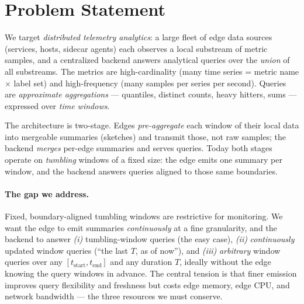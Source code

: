 
\section{Problem Statement}
\label{sec:problem}

We target \emph{distributed telemetry analytics}: a large fleet of edge
data sources (services, hosts, sidecar agents) each observes a local
substream of metric samples, and a centralized backend answers
analytical queries over the \emph{union} of all substreams. The metrics
are high-cardinality (many time series = metric name $\times$ label set)
and high-frequency (many samples per series per second). Queries are
\emph{approximate aggregations} --- quantiles, distinct counts, heavy
hitters, sums --- expressed over \emph{time windows}.

The architecture is two-stage. Edges \emph{pre-aggregate} each window of
their local data into mergeable summaries (sketches) and transmit those,
not raw samples; the backend \emph{merges} per-edge summaries and serves
queries. Today both stages operate on \emph{tumbling} windows of a fixed
size: the edge emits one summary per window, and the backend answers
queries aligned to those same boundaries.

\paragraph{The gap we address.} Fixed, boundary-aligned tumbling windows
are restrictive for monitoring. We want the edge to emit summaries
\emph{continuously} at a fine granularity, and the backend to answer
\emph{(i)} tumbling-window queries (the easy case), \emph{(ii)}
\emph{continuously} updated window queries (``the last $T$, as of now''),
and \emph{(iii)} \emph{arbitrary} window queries over any
$[t_\mathrm{start}, t_\mathrm{end}]$ and any duration $T$, ideally without
the edge knowing the query windows in advance. The central tension is
that finer emission improves query flexibility and freshness but costs
edge memory, edge CPU, and network bandwidth --- the three resources we
must conserve.


